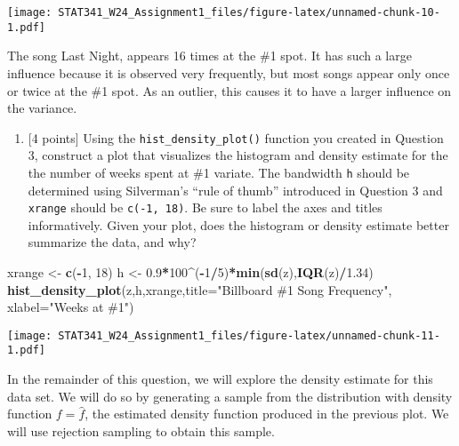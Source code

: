 \documentclass[
]{article}
\newenvironment{Shaded}{\begin{snugshade}}{\end{snugshade}}
\newcommand{\AttributeTok}[1]{\textcolor[rgb]{0.13,0.29,0.53}{#1}}
\newcommand{\DecValTok}[1]{\textcolor[rgb]{0.00,0.00,0.81}{#1}}
\newcommand{\FloatTok}[1]{\textcolor[rgb]{0.00,0.00,0.81}{#1}}
\newcommand{\FunctionTok}[1]{\textcolor[rgb]{0.13,0.29,0.53}{\textbf{#1}}}
\newcommand{\NormalTok}[1]{#1}
\newcommand{\OtherTok}[1]{\textcolor[rgb]{0.56,0.35,0.01}{#1}}
\newcommand{\SpecialCharTok}[1]{\textcolor[rgb]{0.81,0.36,0.00}{\textbf{#1}}}
\newcommand{\StringTok}[1]{\textcolor[rgb]{0.31,0.60,0.02}{#1}}
\providecommand{\tightlist}{%
  \setlength{\itemsep}{0pt}\setlength{\parskip}{0pt}}
\begin{document}
\texttt{[image: STAT341\_W24\_Assignment1\_files/figure-latex/unnamed-chunk-10-1.pdf]}

The song Last Night, appears 16 times at the \#1 spot. It has such a
large influence because it is observed very frequently, but most songs
appear only once or twice at the \#1 spot. As an outlier, this causes it
to have a larger influence on the variance.

\begin{enumerate}
\def\labelenumi{(\alph{enumi})}
\setcounter{enumi}{2}
\tightlist
\item
  {[}4 points{]} Using the \texttt{hist\_density\_plot()} function you
  created in Question 3, construct a plot that visualizes the histogram
  and density estimate for the the number of weeks spent at \#1 variate.
  The bandwidth \texttt{h} should be determined using Silverman's ``rule
  of thumb'' introduced in Question 3 and \texttt{xrange} should be
  \texttt{c(-1,\ 18)}. Be sure to label the axes and titles
  informatively. Given your plot, does the histogram or density estimate
  better summarize the data, and why?
\end{enumerate}

\begin{Shaded}
\begin{Highlighting}[]
\NormalTok{xrange }\OtherTok{\textless{}{-}} \FunctionTok{c}\NormalTok{(}\SpecialCharTok{{-}}\DecValTok{1}\NormalTok{, }\DecValTok{18}\NormalTok{)}
\NormalTok{h }\OtherTok{\textless{}{-}} \FloatTok{0.9}\SpecialCharTok{*}\DecValTok{100}\SpecialCharTok{\^{}}\NormalTok{(}\SpecialCharTok{{-}}\DecValTok{1}\SpecialCharTok{/}\DecValTok{5}\NormalTok{)}\SpecialCharTok{*}\FunctionTok{min}\NormalTok{(}\FunctionTok{sd}\NormalTok{(z),}\FunctionTok{IQR}\NormalTok{(z)}\SpecialCharTok{/}\FloatTok{1.34}\NormalTok{)}
\FunctionTok{hist\_density\_plot}\NormalTok{(z,h,xrange,}\AttributeTok{title=}\StringTok{"Billboard \#1 Song Frequency"}\NormalTok{,}
                  \AttributeTok{xlabel=}\StringTok{"Weeks at \#1"}\NormalTok{)}
\end{Highlighting}
\end{Shaded}

\texttt{[image: STAT341\_W24\_Assignment1\_files/figure-latex/unnamed-chunk-11-1.pdf]}

In the remainder of this question, we will explore the density estimate
for this data set. We will do so by generating a sample from the
distribution with density function \(f = \hat{f}\), the estimated
density function produced in the previous plot. We will use rejection
sampling to obtain this sample.
\end{document}
